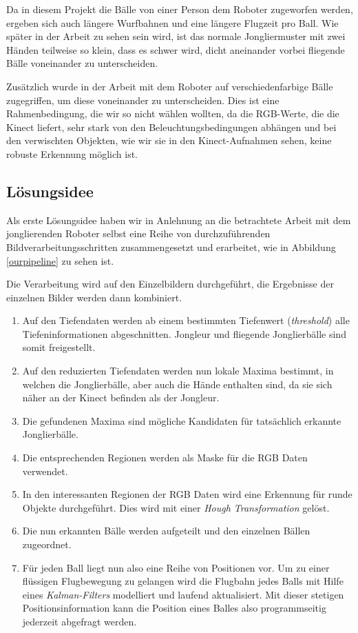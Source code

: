 \documentclass[12pt,a4paper,ngerman]{scrartcl}
\begin{document}
Da in diesem Projekt die Bälle von einer Person dem Roboter zugeworfen werden,
ergeben sich auch längere Wurfbahnen und eine längere Flugzeit pro Ball. Wie
später in der Arbeit zu sehen sein wird, ist das normale Jongliermuster mit zwei
Händen teilweise so klein, dass es schwer wird, dicht aneinander vorbei fliegende
Bälle voneinander zu unterscheiden.

Zusätzlich wurde in der Arbeit mit dem Roboter auf verschiedenfarbige Bälle
zugegriffen, um diese voneinander zu unterscheiden. Dies ist eine Rahmenbedingung,
die wir so nicht wählen wollten, da die RGB-Werte, die die Kinect liefert, sehr stark
von den Beleuchtungsbedingungen abhängen und bei den verwischten Objekten, wie
wir sie in den Kinect-Aufnahmen sehen, keine robuste Erkennung möglich ist.


\subsection{Lösungsidee}

Als erste Lösungsidee haben wir in Anlehnung an die betrachtete Arbeit mit dem
jonglierenden Roboter selbst eine Reihe von durchzuführenden Bildverarbeitungsschritten
zusammengesetzt und erarbeitet, wie in Abbildung \ref{ourpipeline} zu sehen ist.

Die Verarbeitung wird auf den Einzelbildern durchgeführt, die Ergebnisse der
einzelnen Bilder werden dann kombiniert.

\begin{enumerate}
\item Auf den Tiefendaten werden ab einem bestimmten Tiefenwert (\textit{threshold})
	alle Tiefeninformationen abgeschnitten. Jongleur und fliegende Jonglierbälle sind
	somit freigestellt.
\item Auf den reduzierten Tiefendaten werden nun lokale Maxima bestimmt, in welchen die
	Jonglierbälle, aber auch die Hände enthalten sind, da sie sich näher an der Kinect befinden als der
	Jongleur.
\item Die gefundenen Maxima sind mögliche Kandidaten für tatsächlich erkannte
	Jonglierbälle.
\item Die entsprechenden Regionen werden als Maske für die RGB Daten verwendet.
\item In den interessanten Regionen der RGB Daten wird eine Erkennung für runde
	Objekte durchgeführt. Dies wird mit einer \textit{Hough Transformation} gelöst.
\item Die nun erkannten Bälle werden aufgeteilt und den einzelnen Bällen zugeordnet.
\item Für jeden Ball liegt nun also eine Reihe von Positionen vor. Um zu einer
	flüssigen Flugbewegung zu gelangen wird die Flugbahn jedes Balls mit Hilfe eines
	\textit{Kalman-Filters} modelliert und laufend aktualisiert. Mit dieser stetigen
	Positionsinformation kann die Position eines Balles also programmseitig jederzeit
	abgefragt werden.
\end{enumerate}
\end{document}
